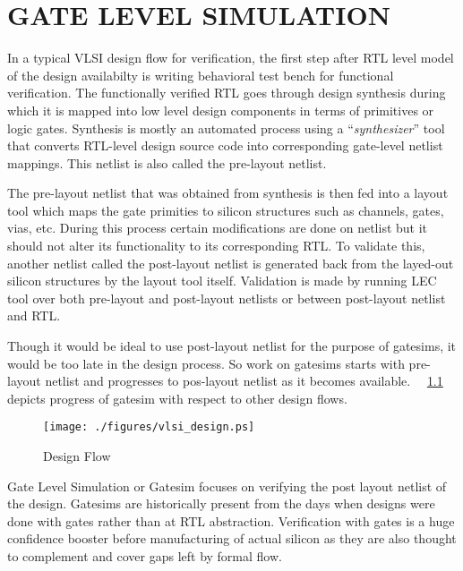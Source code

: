 \chapter{GATE LEVEL SIMULATION}
\label{chap:gate_intro.tex}

In a typical VLSI design flow for verification, the first step after RTL level model of the design availabilty is writing behavioral test bench for functional verification. The functionally verified RTL goes through design synthesis during which it is mapped into low level design components in terms of primitives or logic gates. Synthesis is mostly an automated process using a ``{\it synthesizer}'' tool that converts RTL-level design source code into corresponding gate-level netlist mappings. This netlist is also called the pre-layout netlist.

The pre-layout netlist that was obtained from synthesis is then fed into a layout tool which maps the gate primities to silicon structures such as channels, gates, vias, etc. During this process certain modifications are done on netlist but it should not alter its functionality to its corresponding RTL. To validate this, another netlist called the post-layout netlist is generated back from the layed-out silicon structures by the layout tool itself. Validation is made by running LEC tool over both pre-layout and post-layout netlists or between post-layout netlist and RTL.

Though it would be ideal to use post-layout netlist for the purpose of gatesims, it would be too late in the design process. So work on gatesims starts with pre-layout netlist and progresses to pos-layout netlist as it becomes available. ~\figurename{~\ref{fig:vlsi_design.ps}} depicts progress of gatesim with respect to other design flows.

\begin{figure}[H]
\centering
\texttt{[image: ./figures/vlsi\_design.ps]}
\caption{Design Flow}
\label{fig:vlsi_design.ps}
\end{figure}
Gate Level Simulation or Gatesim focuses on verifying the post layout netlist of the design. Gatesims are historically present from the days when designs were done with gates rather than at RTL abstraction. Verification with gates is a huge confidence booster before manufacturing of actual silicon as they are also thought to complement and cover gaps left by formal flow.


